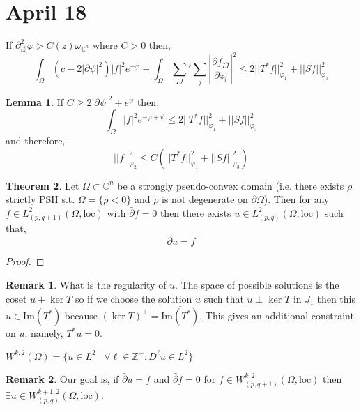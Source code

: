 \documentclass[12pt]{extarticle}
\newcommand{\C}{\mathbb{C}}
\newcommand{\Zplus}{\mathbb{Z}^{+}}
\renewcommand{\Im}[1]{\mathrm{Im}(#1)}
\newcommand{\pderiv}[2]{\frac{\partial{#1}}{\partial{#2}}}
\theoremstyle{definition}
\newtheorem{theorem}{Theorem}[section]
\newtheorem{lemma}[theorem]{Lemma}
\newtheorem{remark}{Remark}
\newenvironment{definition}[1][Definition:]{\begin{trivlist}
\item[\hskip \labelsep {\bfseries #1}]}{\end{trivlist}}
\begin{document}
\section{April 18}

If $\partial^2_{i \bar{k}} \varphi > C(z) \omega_{\C^n}$ where $C > 0$ then,
\[ \int_\Omega (c  - 2 |\partial \psi|^2 )|f|^2 e^{-\varphi} + \int_{\Omega} \sum_{IJ}' \sum_j \left| \pderiv{f_{I \bar{J}}}{\bar{z}_j} \right|^2 \le 2 || T^* f ||^2_{\varphi_1} + ||S f ||^2_{\varphi_3} \]

\begin{lemma}
If $C \ge 2 |\partial \psi|^2 + e^{\psi}$ then,
\[ \int_\Omega |f|^2 e^{-\varphi + \psi} \le 2 ||T^* f ||^2_{\varphi_1} + || Sf ||_{\varphi_3}^2 \]
and therefore,
\[ || f ||_{\varphi_2}^2 \le C \left( || T^* f ||^2_{\varphi_1} + || S f ||_{\varphi_3}^2 \right) \]
\end{lemma}

\begin{theorem}
Let $\Omega \subset \C^n$ be a strongly pseudo-convex domain (i.e. there exists $\rho$ strictly PSH s.t. $\Omega = \{ \rho < 0 \}$ and $\rho$ is not degenerate on $\partial \Omega$). Then for any $f \in L_{(p, q + 1)}^2(\Omega, \text{loc})$ with $\bar{\partial} f = 0$ then  there exists $u \in L^2_{(p,q)}(\Omega, \text{loc})$ such that,
\[ \bar{\partial} u = f \] 
\end{theorem}

\begin{proof}

\end{proof}

\begin{remark}
What is the regularity of $u$. The space of possible solutions is the coset $u + \ker{T}$ so if we choose the solution $u$ such that $u \perp \ker{T}$ in $J_1$ then this $u \in \Im{T^*}$ because $(\ker{T})^\perp = \overline{\Im{T^*}}$. This gives an additional constraint on $u$, namely, $T^* u = 0$. 
\end{remark}

\begin{definition}
$W^{k,2}(\Omega) = \{ u \in L^2 \mid \forall \ell \in \Zplus : D^\ell u \in L^2 \}$
\end{definition}

\begin{remark}
Our goal is, if $\bar{\partial} u = f$ and $\bar{\partial} f = 0$ for $f \in W^{k,2}_{(p, q+1)}(\Omega, \text{loc})$ then $\exists u \in W^{k+1,2}_{(p,q)}(\Omega, \text{loc})$. 
\end{remark}
\end{document}
